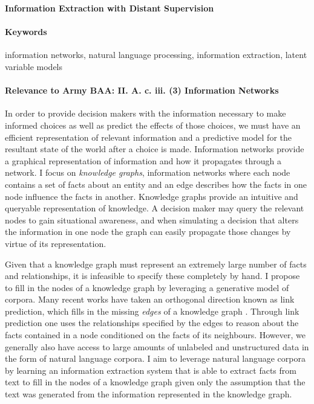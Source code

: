 \documentclass[12pt]{article}
\begin{document}

\begin{center}
\textbf{Information Extraction with Distant Supervision}
\end{center}

\paragraph{Keywords}
information networks, natural language processing, information extraction, latent variable models

\paragraph{Relevance to Army BAA: II. A. c. iii. (3) Information Networks}
In order to provide decision makers with the information
necessary to make informed choices as well as predict the effects of those choices,
we must have an efficient representation of relevant information and a predictive model
for the resultant state of the world after a choice is made.
Information networks provide a graphical representation of information and how it
propagates through a network.
I focus on \textit{knowledge graphs}, information networks where each node contains a set of facts
about an entity and an edge describes how the facts in one node influence the facts in another.
Knowledge graphs provide an intuitive and queryable representation of knowledge.
A decision maker may query the relevant nodes to gain situational awareness, and
when simulating a decision that alters the information in one node
the graph can easily propagate those changes by virtue of its representation.

Given that a knowledge graph must represent an extremely large number of facts and relationships,
it is infeasible to specify these completely by hand.
I propose to fill in the nodes of a knowledge graph by leveraging a generative model
of corpora.
Many recent works have taken an orthogonal direction known as link prediction,
which fills in the missing \textit{edges} of a knowledge graph \citep{chen2018diva}.
Through link prediction one uses the relationships
specified by the edges to reason about the facts contained in a node conditioned on
the facts of its neighbours.
However, we generally also have access to large amounts of unlabeled and unstructured data
in the form of natural language corpora.
I aim to leverage natural language corpora by
learning an information extraction system that is able to 
extract facts from text to fill in the nodes of a knowledge graph
given only the assumption that the text was generated from the information
represented in the knowledge graph.
\end{document}
